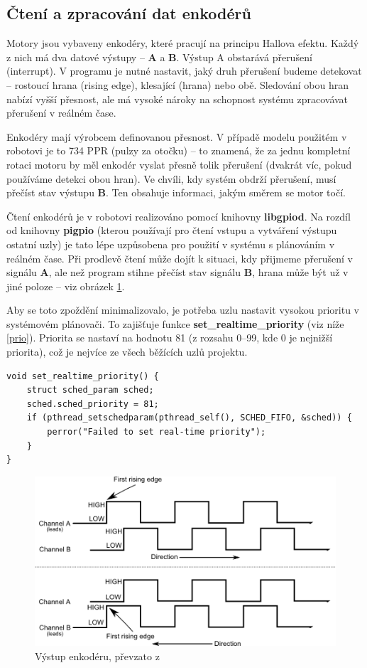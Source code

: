 \subsection*{Čtení a zpracování dat enkodérů}
Motory jsou vybaveny enkodéry, které pracují na principu Hallova efektu. Každý z nich má dva datové výstupy -- \textbf{A} a  \textbf{B}. Výstup A obstarává přerušení (interrupt). V programu je nutné nastavit, jaký druh přerušení budeme detekovat -- rostoucí hrana (rising edge), klesající (hrana) nebo obě. Sledování obou hran nabízí vyšší přesnost, ale má vysoké nároky na schopnost systému zpracovávat přerušení v reálném čase. 

Enkodéry mají výrobcem definovanou přesnost. V případě modelu použitém v robotovi je to 734 PPR (pulzy za otočku) -- to znamená, že za jednu kompletní rotaci motoru by měl enkodér vyslat přesně tolik přerušení (dvakrát víc, pokud používáme detekci obou hran). Ve chvíli, kdy systém obdrží přerušení, musí přečíst stav výstupu \textbf{B}. Ten obsahuje informaci, jakým směrem se motor točí. 

Čtení enkodérů je v robotovi realizováno pomocí knihovny \textbf{libgpiod}. Na rozdíl od knihovny \textbf{pigpio} (kterou používají pro čtení vstupu a vytváření výstupu ostatní uzly) je tato lépe uzpůsobena pro  použití v systému s plánováním v reálném čase. Při prodlevě čtení může dojít k situaci, kdy přijmeme přerušení v signálu \textbf{A}, ale než program stihne přečíst stav signálu \textbf{B}, hrana může být už v jiné poloze -- viz obrázek \ref{enc}.

Aby se toto zpoždění minimalizovalo, je potřeba uzlu nastavit vysokou prioritu v systémovém plánovači. To zajišťuje funkce \textbf{set\_realtime\_priority} (viz níže \ref{prio}). Priorita se nastaví na hodnotu 81 (z rozsahu 0--99, kde 0 je nejnižší priorita), což je nejvíce ze všech běžících uzlů projektu.

\begin{verbatim}
void set_realtime_priority() {
    struct sched_param sched;
    sched.sched_priority = 81;
    if (pthread_setschedparam(pthread_self(), SCHED_FIFO, &sched)) {
        perror("Failed to set real-time priority");
    }
}
\end{verbatim}
\label{prio}

\begin{figure}[H]
    \centering
    \includegraphics[width=0.7\linewidth]{obrazky-figures/edges.png}
    \caption {Výstup enkodéru, převzato z \cite{encoder}}
    \label{enc}
\end{figure}

